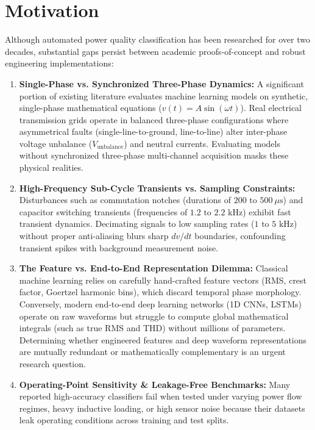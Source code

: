 \documentclass[12pt,a4paper]{report}
\begin{document}
\section{Motivation}
Although automated power quality classification has been researched for over two decades, substantial gaps persist between academic proofs-of-concept and robust engineering implementations:
\begin{enumerate}
    \item \textbf{Single-Phase vs. Synchronized Three-Phase Dynamics:} A significant portion of existing literature evaluates machine learning models on synthetic, single-phase mathematical equations ($v(t) = A\sin(\omega t)$). Real electrical transmission grids operate in balanced three-phase configurations where asymmetrical faults (single-line-to-ground, line-to-line) alter inter-phase voltage unbalance ($V_{\text{unbalance}}$) and neutral currents. Evaluating models without synchronized three-phase multi-channel acquisition masks these physical realities.
    \item \textbf{High-Frequency Sub-Cycle Transients vs. Sampling Constraints:} Disturbances such as commutation notches (durations of $200\text{ to }500\ \mu\text{s}$) and capacitor switching transients (frequencies of $1.2\text{ to }2.2\text{ kHz}$) exhibit fast transient dynamics. Decimating signals to low sampling rates ($1\text{ to }5\text{ kHz}$) without proper anti-aliasing blurs sharp $dv/dt$ boundaries, confounding transient spikes with background measurement noise.
    \item \textbf{The Feature vs. End-to-End Representation Dilemma:} Classical machine learning relies on carefully hand-crafted feature vectors (RMS, crest factor, Goertzel harmonic bins), which discard temporal phase morphology. Conversely, modern end-to-end deep learning networks (1D CNNs, LSTMs) operate on raw waveforms but struggle to compute global mathematical integrals (such as true RMS and THD) without millions of parameters. Determining whether engineered features and deep waveform representations are mutually redundant or mathematically complementary is an urgent research question.
    \item \textbf{Operating-Point Sensitivity \& Leakage-Free Benchmarks:} Many reported high-accuracy classifiers fail when tested under varying power flow regimes, heavy inductive loading, or high sensor noise because their datasets leak operating conditions across training and test splits.
\end{enumerate}
\end{document}
